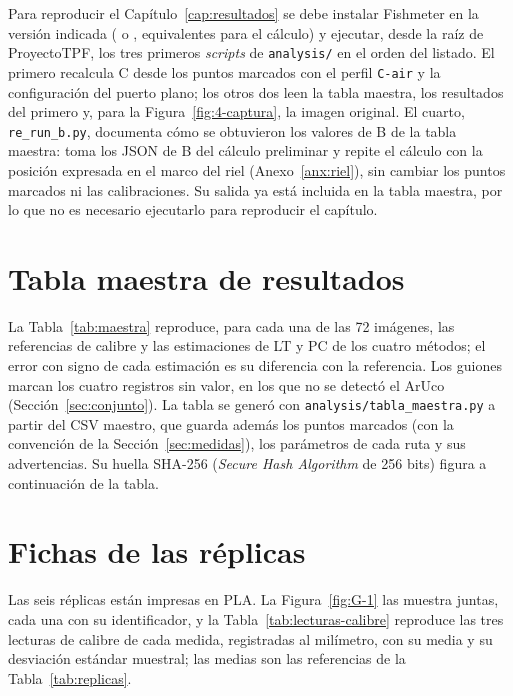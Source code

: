 Para reproducir el Capítulo~\ref{cap:resultados} se debe instalar Fishmeter en la versión indicada (\texttt{\RepoTag} o \texttt{\RepoTagBase}, equivalentes para el cálculo) y ejecutar, desde la raíz de ProyectoTPF, los tres primeros \emph{scripts} de \texttt{analysis/} en el orden del listado. El primero recalcula C desde los puntos marcados con el perfil \texttt{C-air} y la configuración del puerto plano; los otros dos leen la tabla maestra, los resultados del primero y, para la Figura~\ref{fig:4-captura}, la imagen original. El cuarto, \texttt{re\_run\_b.py}, documenta cómo se obtuvieron los valores de B de la tabla maestra: toma los JSON de B del cálculo preliminar y repite el cálculo con la posición expresada en el marco del riel (Anexo~\ref{anx:riel}), sin cambiar los puntos marcados ni las calibraciones. Su salida ya está incluida en la tabla maestra, por lo que no es necesario ejecutarlo para reproducir el capítulo.

\chapter{Tabla maestra de resultados}
\label{anx:maestra}

La Tabla~\ref{tab:maestra} reproduce, para cada una de las 72 imágenes, las referencias de calibre y las estimaciones de LT y PC de los cuatro métodos; el error con signo de cada estimación es su diferencia con la referencia. Los guiones marcan los cuatro registros sin valor, en los que no se detectó el ArUco (Sección~\ref{sec:conjunto}). La tabla se generó con \texttt{analysis/tabla\_maestra.py} a partir del CSV maestro, que guarda además los puntos marcados (con la convención de la Sección~\ref{sec:medidas}), los parámetros de cada ruta y sus advertencias. Su huella SHA-256 (\emph{Secure Hash Algorithm} de 256 bits) figura a continuación de la tabla.




\chapter{Fichas de las réplicas}
\label{anx:fichas}

Las seis réplicas están impresas en PLA. La Figura~\ref{fig:G-1} las muestra juntas, cada una con su identificador, y la Tabla~\ref{tab:lecturas-calibre} reproduce las tres lecturas de calibre de cada medida, registradas al milímetro, con su media y su desviación estándar muestral; las medias son las referencias de la Tabla~\ref{tab:replicas}.

